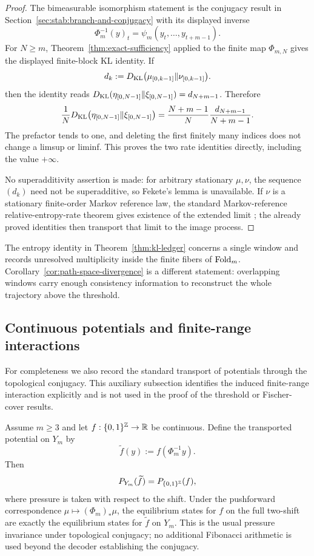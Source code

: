 \begin{proof}
The bimeasurable isomorphism statement is the conjugacy result in
Section~\ref{sec:stab:branch-and-conjugacy}
with its displayed inverse
\[
\Phi_m^{-1}(y)_t=\psi_m(y_t,\ldots,y_{t+m-1}).
\]
For $N\ge m$, Theorem~\ref{thm:exact-sufficiency} applied to the finite map
$\Phi_{m,N}$ gives the displayed finite-block KL identity. If
\[
d_k:=D_{\mathrm{KL}}\bigl(\mu_{[0,k-1]}\|\nu_{[0,k-1]}\bigr).
\]
then the identity reads
$D_{\mathrm{KL}}(\eta_{[0,N-1]}\|\xi_{[0,N-1]})=d_{N+m-1}$.  Therefore
\[
\frac1N D_{\mathrm{KL}}\bigl(\eta_{[0,N-1]}\|\xi_{[0,N-1]}\bigr)
=\frac{N+m-1}{N}\frac{d_{N+m-1}}{N+m-1}.
\]
The prefactor tends to one, and deleting the first finitely many indices does
not change a limsup or liminf.  This proves the two rate identities directly,
including the value $+\infty$.

No superadditivity assertion is made: for arbitrary stationary $\mu,\nu$, the
sequence $(d_k)$ need not be superadditive, so Fekete's lemma is unavailable.
If $\nu$ is a stationary finite-order Markov reference law, the standard
Markov-reference relative-entropy-rate theorem gives existence of the
extended limit \cite[Chapter~8]{Gray2011}; the already proved identities then
transport that limit to the image process.
\end{proof}

\begin{remark}
The entropy identity in Theorem~\ref{thm:kl-ledger} concerns a single
window and records unresolved multiplicity inside the finite fibers of
$\mathrm{Fold}_m$. Corollary~\ref{cor:path-space-divergence} is a different statement:
overlapping windows carry enough consistency information to reconstruct the
whole trajectory above the threshold.
\end{remark}

\subsection{Continuous potentials and finite-range interactions}\label{sec:measurement:renorm}

For completeness we also record the standard transport of potentials through
the topological conjugacy. This auxiliary subsection identifies the induced
finite-range interaction explicitly and is not used in the proof of the
threshold or Fischer-cover results.

\begin{theorem}\label{thm:continuous-potentials}
Assume $m\ge3$ and let $f:\{0,1\}^{\mathbb{Z}}\to\mathbb{R}$ be continuous.  Define the
transported potential on $Y_m$ by
\[
\widetilde f(y):=f(\Phi_m^{-1}y).
\]
Then
\[
P_{Y_m}(\widetilde f)=P_{\{0,1\}^{\mathbb{Z}}}(f),
\]
where pressure is taken with respect to the shift.  Under the pushforward
correspondence $\mu\mapsto(\Phi_m)_*\mu$, the equilibrium states for $f$ on
the full two-shift are exactly the equilibrium states for $\widetilde f$ on
$Y_m$.
This is the usual pressure invariance under topological conjugacy; no additional
Fibonacci arithmetic is used beyond the decoder establishing the conjugacy.
\end{theorem}

